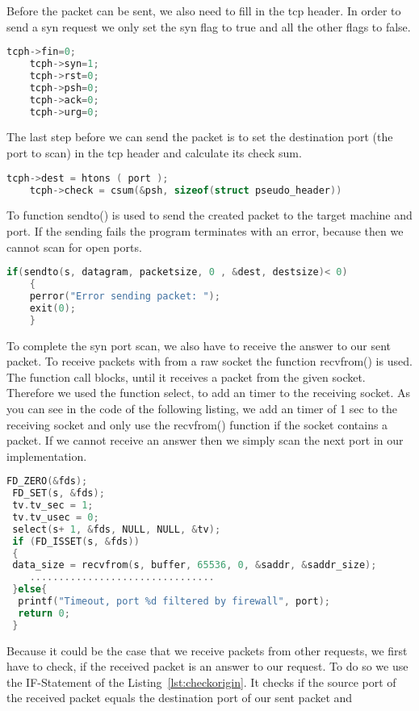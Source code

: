 \documentclass[a4paper]{scrartcl}
\begin{document}
	Before the packet can be sent, we also need to fill in the tcp header. In order to send a syn request we only set the syn flag to true and all the other flags to false.
	\begin{lstlisting}[frame= single, language=C, caption= C code to set flags in tcp header]
	tcph->fin=0;
	tcph->syn=1;
	tcph->rst=0;
	tcph->psh=0;
	tcph->ack=0;
	tcph->urg=0;
	\end{lstlisting}
	The last step before we can send the packet is to set the destination port (the port to scan)  in the tcp header and calculate its check sum.
	\begin{lstlisting}[frame= single, language=C, caption= C code to set port and calculate checksum in tcp header]
	tcph->dest = htons ( port );
	tcph->check = csum(&psh, sizeof(struct pseudo_header))
	\end{lstlisting}
	To function sendto() is used to send the created packet to the target machine and port. If the sending fails the program terminates with
	an error, because then we cannot scan for open ports.
	\begin{lstlisting}[frame= single, language=C, caption= C code to set port and calculate checksum in tcp header]
	if(sendto(s, datagram, packetsize, 0 , &dest, destsize)< 0)
	{
	perror("Error sending packet: ");
	exit(0);
	}
	\end{lstlisting}
	To complete the syn port scan, we also have to receive the answer to our sent packet. To receive packets with from a raw socket the function recvfrom() is used. The function call blocks, until it
	receives a packet from the given socket. Therefore we used the function select, to add an timer to the receiving socket. As you can see in the code of the following listing, we add an timer of 1 sec
	to the receiving socket and only use the recvfrom() function if the socket contains a packet. If we cannot receive an answer then we simply scan the next port in our implementation.
	\begin{lstlisting}[frame= single, language=C, caption= C code to receive the packet]
 FD_ZERO(&fds);
 FD_SET(s, &fds);
 tv.tv_sec = 1;
 tv.tv_usec = 0;
 select(s+ 1, &fds, NULL, NULL, &tv);		
 if (FD_ISSET(s, &fds))
 {
 data_size = recvfrom(s, buffer, 65536, 0, &saddr, &saddr_size);
	................................
 }else{
  printf("Timeout, port %d filtered by firewall", port);
  return 0;
 }
	\end{lstlisting}
	Because it could be the case that we receive packets from other requests, we first have to check, if the received packet
	is an answer to our request. To do so we use the IF-Statement of the Listing~\ref{lst:checkorigin}. It checks if the source port of the received packet equals the destination port of our sent packet and
\end{document}
